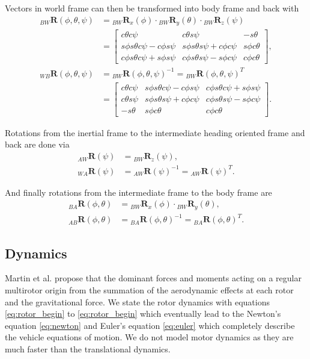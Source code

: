 Vectors in world frame can then be transformed into body frame and back with
\begin{align}
_{BW}\mathbf{R} (\phi,\theta,\psi) &= {_{BW}\mathbf{R}_x} (\phi) \cdot {_{BW}\mathbf{R}_y} (\theta) \cdot {_{BW}\mathbf{R}_z} (\psi) \\
&=
 \begin{bmatrix}
c\theta c\psi 				&c\theta s\psi 				& -s\theta  \\
s\phi s\theta c\psi - c\phi s\psi  	& s\phi s\theta s\psi + c\phi c\psi 	& s\phi c\theta \\
c\phi s\theta c\psi + s\phi s\psi	& c\phi s\theta s\psi - s\phi c\psi 	& c\phi c\theta
\end{bmatrix} ,\\
_{WB}\mathbf{R} (\phi,\theta,\psi) &= {_{BW}\mathbf{R} (\phi,\theta,\psi)}^{-1} = {_{BW}\mathbf{R} (\phi,\theta,\psi)}^{T} \\
&=
\begin{bmatrix}
c\theta c\psi & s\phi s\theta c\psi - c\phi s\psi & c\phi s\theta c\psi + s\phi s\psi \\
c\theta s\psi & s\phi s\theta s\psi + c\phi c\psi & c\phi s\theta s\psi - s\phi c\psi \\
-s\theta & s\phi c\theta & c\phi c\theta
\end{bmatrix}.
\end{align}

Rotations from the inertial frame to the intermediate heading oriented frame and back are done via
\begin{align}
_{AW}\mathbf{R} (\psi) &= {_{BW}\mathbf{R}_z} (\psi) ,\\
_{WA}\mathbf{R} (\psi) &= {_{AW}\mathbf{R} (\psi)}^{-1} = {_{AW}\mathbf{R} (\psi)}^{T}.
\end{align}

And finally rotations from the intermediate frame to the body frame are
\begin{align}
_{BA}\mathbf{R} (\phi,\theta) &= {_{BW}\mathbf{R}_x} (\phi) \cdot {_{BW}\mathbf{R}_y} (\theta)  ,\\
_{AB}\mathbf{R} (\phi,\theta) &= {_{BA}\mathbf{R} (\phi,\theta)}^{-1} = {_{BA}\mathbf{R} (\phi,\theta)}^{T}.
\end{align}


\subsection{Dynamics}
Martin et al. \cite{Martin2010} propose that the dominant forces and moments acting on a regular multirotor origin from the summation of the aerodynamic effects at each rotor and the gravitational force. We state the rotor dynamics with equations \ref{eq:rotor_begin} to \ref{eq:rotor_begin} which eventually lead to the Newton's equation \ref{eq:newton} and Euler's equation \ref{eq:euler} which completely describe the vehicle equations of motion. We do not model motor dynamics as they are much faster than the translational dynamics.

